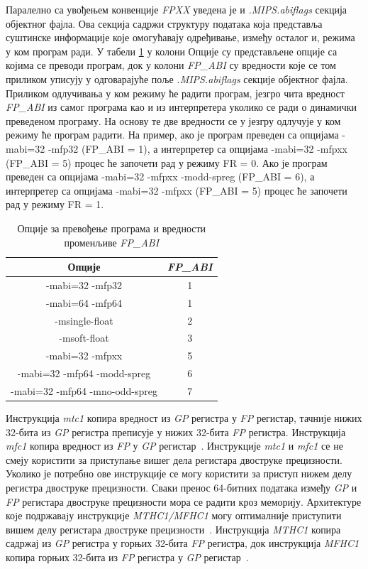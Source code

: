 \documentclass[12pt,oneside]{memoir}
\begin{document}
\indent Паралелно са увођењем конвенције \textit{FPXX} уведена је и  \textit{.MIPS.abiflags} секција објектног фајла. Ова секција садржи структуру података која представља суштинске информације које омогућавају одређивање, између осталог и, режима у ком програм ради. У табели \ref{tbl:fpabi} у колони Опције су представљене опције са којима се преводи програм, док у колони \textit{FP\_ABI} су вредности које се том приликом уписују у одговарајуће поље \textit{.MIPS.abiflags} секције објектног фајла. Приликом одлучивања у ком режиму ће радити програм, језгро чита вредност \textit{FP\_ABI} из самог програма као и из интерпретера уколико се ради о динамички преведеном програму. На основу те две вредности се у језгру одлучује у ком режиму ће програм радити. На пример, ако је програм преведен са опцијама -mabi=32 -mfp32 (FP\_ABI = 1), а интерпретер са опцијама  -mabi=32 -mfpxx (FP\_ABI = 5) процес ће започети рад у режиму FR = 0. Ако је програм преведен са опцијама -mabi=32 -mfpxx -modd-spreg (FP\_ABI = 6), а интерпретер са опцијама  -mabi=32 -mfpxx (FP\_ABI = 5) процес ће започети рад у режиму FR = 1.


\begin{table}
\centering
\caption{Опције за превођење програма и вредности променљиве \textit{FP\_ABI}}
\label{tbl:fpabi}
\begin{tabular}{ |c|c| }
Опције & \textit{FP\_ABI} \\\midrule
-mabi=32 -mfp32 & 1 \\
-mabi=64 -mfp64 & 1 \\
-msingle-float  & 2 \\
-msoft-float    & 3 \\
-mabi=32 -mfpxx & 5 \\
-mabi=32 -mfp64 -modd-spreg & 6 \\
-mabi=32 -mfp64 -mno-odd-spreg & 7 \\
\end{tabular}
\end{table}

\indent Инструкција \textit{mtc1} копира вредност из \textit{GP} регистра у \textit{FP} регистар, тачније нижих 32-бита из \textit{GP} регистра  преписује у нижих 32-бита \textit{FP} регистра. Инструкција \textit{mfc1} копира вредност из \textit{FP} у \textit{GP} регистар~\cite{MIPSInstrSet}. Инструкције \textit{mtc1} и \textit{mfc1} се не смеју користити за приступање вишег дела регистара двоструке прецизности. Уколико је потребно ове инструкције се могу користити за приступ нижем делу регистра двоструке прецизности. Сваки пренос 64-битних података између \textit{GP} и \textit{FP} регистара двоструке прецизности мора се радити кроз меморију. Архитектуре коjе подржаваjу инструкциjе \textit{MTHC1/MFHC1} могу оптималније приступити вишем делу регистара двоструке прецизности~\cite{fpxxRef}. Инструкција \textit{MTHC1} копира садржај из \textit{GP} регистра у горњих 32-бита \textit{FP} регистра, док инструкција \textit{MFHC1} копира горњих 32-бита из \textit{FP} регистра у \textit{GP} регистар~\cite{MIPSInstrSet}.
\end{document}
